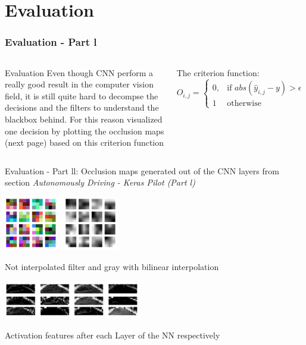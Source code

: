 \documentclass{beamer}
\begin{document}
\section{Evaluation}
\begin{frame}
\frametitle{Evaluation - Part l}
\begin{columns}[c] %
\begin{block}{Evaluation}
Even though CNN perform a really good result in the computer vision field, it is still quite hard to decompse the decisions and the filters to understand the blackbox behind. For this reason visualized one decision by plotting the occlusion maps (next page) based on this criterion function
\end{block}
The criterion function:
\begin{equation}
O_{i,j}= \begin{cases}
    0,& \text{if } abs(\hat{y}_{i,j} - y) > \epsilon\\
    1              & \text{otherwise} \end{cases}
\end{equation}
\end{columns}
\end{frame}
\begin{frame}
\begin{block}{Evaluation - Part ll: Occlusion maps generated out of the CNN layers from section \textit{Autonomously Driving - Keras Pilot (Part l)}}
\begin{center}
	\includegraphics[width=5cm]{photo/filter}
\end{center}
\begin{center}
Not interpolated filter and gray with bilinear interpolation
\end{center}

\begin{center}
	\includegraphics[width=6cm]{photo/activations}
\end{center}
\begin{center}
Activation features after each Layer of the NN respectively
\end{center}
\end{block}
\end{frame}
\end{document}
